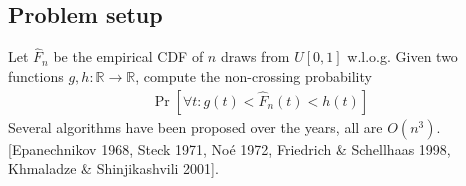 \documentclass[a0,portrait]{a0poster}
\renewcommand{\emph}[1]{{\color{emphtextcolor}#1}}
\newcommand{\pr}[1]{\Pr \left[ #1 \right]}
\newcommand{\sectiontitle}[1]{\section*{\huge \color{textcolor}#1}}
\begin{document}
{\begin{multicols}{2} %
\large %

\sectiontitle{Problem setup}

Let $\hat{F}_n$ be the empirical CDF of $n$ draws from $U[0,1]$ w.l.o.g.
Given two functions $g, h:\mathbb{R} \to \mathbb{R}$,
compute the non-crossing probability
\begin{align} \label{eq:pr_cdf_no_cross}
    \pr{\forall t: g(t) < \hat{F}_n(t) < h(t)}
\end{align}
\emph{Several algorithms have been proposed over the years, all are $O(n^3)$.} [Epanechnikov 1968, Steck 1971, No\'e 1972, Friedrich \& Schellhaas 1998, Khmaladze \& Shinjikashvili 2001].

\end{multicols}}
\end{document}

